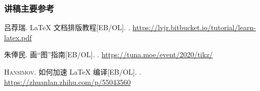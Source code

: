 \begin{frame}
  \frametitle{讲稿主要参考}
  \begin{bibliolist}{00}
    \onlineitem 吕荐瑞.
    \newblock \LaTeX{} 文档排版教程[EB/OL].
    . \url{https://lvjr.bitbucket.io/tutorial/learn-latex.pdf}

    
    \onlineitem 朱俸民.
    \newblock \TikZ{} 画“图”指南[EB/OL].
    . \url{https://tuna.moe/event/2020/tikz/}


    \onlineitem \textsc{Hansimov}. 
    \newblock 如何加速 \LaTeX{} 编译[EB/OL].
    . \url{https://zhuanlan.zhihu.com/p/55043560}
    
  \end{bibliolist}
\end{frame}





\def\bottomthanks{Happy \LaTeX{}ing!}
\makebottom